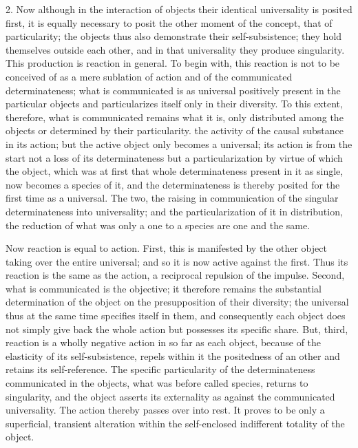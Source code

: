 2. Now although in the interaction of objects
their identical universality is posited first,
it is equally necessary to posit
the other moment of the concept,
that of particularity;
the objects thus also demonstrate their self-subsistence;
they hold themselves outside each other,
and in that universality they produce singularity.
This production is reaction in general.
To begin with, this reaction is not to be conceived of
as a mere sublation of action
and of the communicated determinateness;
what is communicated is as
universal positively present in the particular objects
and particularizes itself only in their diversity.
To this extent, therefore, what is communicated
remains what it is, only distributed among
the objects or determined by their particularity.
the activity of the causal substance in its action;
but the active object only becomes a universal;
its action is from the start not a loss of its determinateness
but a particularization by virtue of which the object,
which was at first that whole determinateness present in it as single,
now becomes a species of it,
and the determinateness is thereby posited
for the first time as a universal.
The two, the raising in communication of
the singular determinateness into universality;
and the particularization of it in distribution,
the reduction of what was only a one to a species
are one and the same.

Now reaction is equal to action.
First, this is manifested by the other object
taking over the entire universal;
and so it is now active against the first.
Thus its reaction is the same as the action,
a reciprocal repulsion of the impulse.
Second, what is communicated is the objective;
it therefore remains the substantial determination of
the object on the presupposition of their diversity;
the universal thus at the same time specifies itself in them,
and consequently each object does not simply give back
the whole action but possesses its specific share.
But, third, reaction is a wholly negative action
in so far as each object,
because of the elasticity of its self-subsistence,
repels within it the positedness of an other
and retains its self-reference.
The specific particularity of the determinateness
communicated in the objects,
what was before called species,
returns to singularity,
and the object asserts its externality
as against the communicated universality.
The action thereby passes over into rest.
It proves to be only a superficial,
transient alteration within the self-enclosed
indifferent totality of the object.


